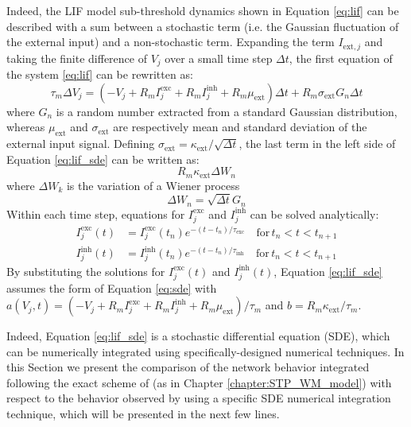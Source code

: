 \documentclass[a4paper, 12pt, twoside, openright]{book}
\begin{document}
Indeed, the LIF model sub-threshold dynamics shown in Equation \eqref{eq:lif} can be described with a sum between a stochastic term (i.e. the Gaussian fluctuation of the external input) and a non-stochastic term. Expanding the term $I_{\text{ext},j}$ and taking the finite difference of $V_j$ over a small time step $\Delta t$, the first equation of the system \eqref{eq:lif} can be rewritten as:
\begin{equation}
    \tau_m \Delta V_j=(-V_j + R_m I_j^{\text{exc}} + R_m I_j^{\text{inh}} + R_m \mu_{\text{ext}})\Delta t
    +R_m \sigma_{\text{ext}}G_n\Delta t
    \label{eq:lif_sde}
\end{equation}
where $G_n$ is a random number extracted from a standard Gaussian distribution, whereas $\mu_{\text{ext}}$ and $\sigma_{\text{ext}}$ are respectively mean and standard deviation of the external input signal. Defining $\sigma_{\text{ext}} = \kappa_{\text{ext}}/\sqrt{\Delta t}$,
the last term in the left side of Equation \eqref{eq:lif_sde} can be written as:
\begin{equation}
    R_m \kappa_{\text{ext}} \Delta W_n
\end{equation}
where $\Delta W_k$ is the variation of a Wiener process
\begin{equation}
    \Delta W_n = \sqrt{ \Delta t } G_n
\end{equation}
Within each time step, equations for $I_j^{\text{exc}}$ and $I_j^{\text{inh}}$ can be solved analytically:
\begin{equation}
\begin{split}
    I_{j}^{\text{exc}} (t) &= I_{j}^{\text{exc}} (t_n) e^{-(t-t_n)/\tau_{\text{exc}}} \quad \text{for}\,  t_n<t<t_{n+1}\\
    I_{j}^{\text{inh}} (t)&= I_{j}^{\text{inh}} (t_n) e^{-(t-t_n)/\tau_{\text{inh}}} \quad \text{for}\,  t_n<t<t_{n+1}
\end{split}
\end{equation}
By substituting the solutions for $I_{j}^{\text{exc}}(t)$ and $I_{j}^{\text{inh}}(t)$, Equation \eqref{eq:lif_sde} assumes the form of Equation \eqref{eq:sde} with $a(V_j,t)=(-V_j+R_mI_{j}^{\text{exc}}+R_m I_j^{\text{inh}}+R_m \mu_{\text{ext}})/\tau_m$ and $b = R_m \kappa_{\text{ext}} / \tau_m$.

Indeed, Equation \eqref{eq:lif_sde} is a stochastic differential equation (SDE), which can be numerically integrated using  specifically-designed numerical techniques. In this Section we present the comparison of the network behavior integrated following the exact scheme of \cite{Rotter1999} (as in Chapter \ref{chapter:STP_WM_model}) with respect to the behavior observed by using a specific SDE numerical integration technique, which will be presented in the next few lines.
\end{document}
